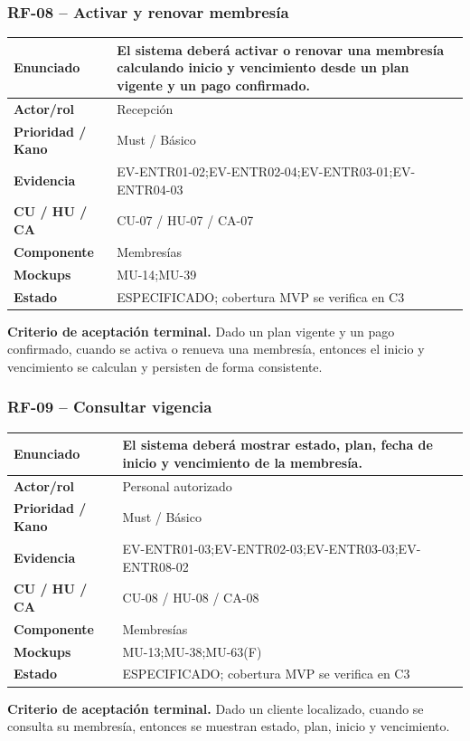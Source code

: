 \documentclass[11pt,a4paper,twoside]{article}
\begin{document}
\subsubsection{RF-08 -- Activar y renovar membresía}
\begin{tabularx}{\textwidth}{|>{\bfseries}p{3.2cm}|X|}\hline
Enunciado & El sistema deberá activar o renovar una membresía calculando inicio y vencimiento desde un plan vigente y un pago confirmado. \\ \hline
Actor/rol & Recepción \\ \hline
Prioridad / Kano & Must / Básico \\ \hline
Evidencia & EV-ENTR01-02;EV-ENTR02-04;EV-ENTR03-01;EV-ENTR04-03 \\ \hline
CU / HU / CA & CU-07 / HU-07 / CA-07 \\ \hline
Componente & Membresías \\ \hline
Mockups & MU-14;MU-39 \\ \hline
Estado & ESPECIFICADO; cobertura MVP se verifica en C3 \\ \hline
\end{tabularx}
\textbf{Criterio de aceptación terminal.} Dado un plan vigente y un pago confirmado, cuando se activa o renueva una membresía, entonces el inicio y vencimiento se calculan y persisten de forma consistente.
\subsubsection{RF-09 -- Consultar vigencia}
\begin{tabularx}{\textwidth}{|>{\bfseries}p{3.2cm}|X|}\hline
Enunciado & El sistema deberá mostrar estado, plan, fecha de inicio y vencimiento de la membresía. \\ \hline
Actor/rol & Personal autorizado \\ \hline
Prioridad / Kano & Must / Básico \\ \hline
Evidencia & EV-ENTR01-03;EV-ENTR02-03;EV-ENTR03-03;EV-ENTR08-02 \\ \hline
CU / HU / CA & CU-08 / HU-08 / CA-08 \\ \hline
Componente & Membresías \\ \hline
Mockups & MU-13;MU-38;MU-63(F) \\ \hline
Estado & ESPECIFICADO; cobertura MVP se verifica en C3 \\ \hline
\end{tabularx}
\textbf{Criterio de aceptación terminal.} Dado un cliente localizado, cuando se consulta su membresía, entonces se muestran estado, plan, inicio y vencimiento.
\end{document}
